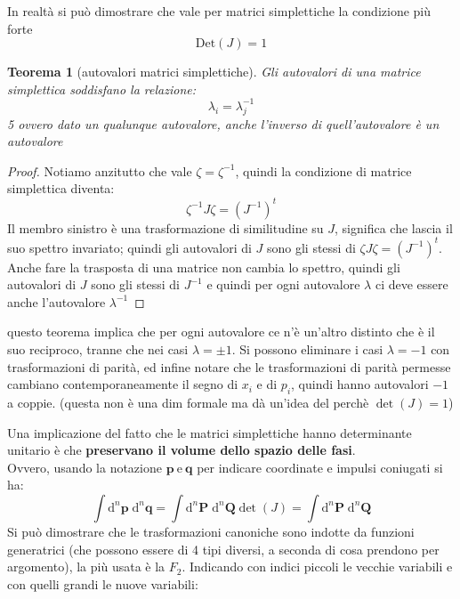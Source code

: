 \documentclass[a4paper,12pt]{article}
\theoremstyle{plain}
\renewcommand{\vec}[1]{{\boldsymbol{#1}}}
\newtheorem{thm}{Teorema}[section]
\theoremstyle{definition}
\renewcommand{\d}{\text{d}}
\newcommand{\econg}{~\text{e}~}
\newcommand{\mom}{\vec{p}}
\theoremstyle{remark}
\begin{document}
In realtà si può dimostrare che vale per matrici simplettiche la condizione più forte 
\[\text{Det}(J)=1\]

\begin{thm} [autovalori matrici simplettiche]
	\label{Sim}
	Gli autovalori di una matrice simplettica soddisfano la relazione:
	\[\lambda_i=\lambda_j^{-1}\]5
	ovvero dato un qualunque autovalore, anche l'inverso di quell'autovalore è un autovalore
\end{thm}

\begin{proof}
	Notiamo anzitutto che vale $\zeta=\zeta^{-1}$, quindi la condizione di matrice simplettica diventa:
	\[\zeta^{-1} J\zeta=\left(J^{-1}\right)^t		\]
	Il membro sinistro è una trasformazione di similitudine su $J$, significa che lascia il suo spettro invariato; quindi gli autovalori di $J$ sono gli stessi di $\zeta J\zeta=\left(J^{-1}\right)^t$.\\Anche fare la trasposta di una matrice non cambia lo spettro, quindi gli autovalori di $J$ sono gli stessi di $J^{-1}$ e quindi per ogni autovalore $\lambda$ ci deve essere anche l'autovalore $\lambda^{-1}$
	
	
	
	
	
	
\end{proof}
\begin{obs}
questo teorema implica che per ogni autovalore ce n'è un'altro distinto che è il suo reciproco, tranne che nei casi $\lambda=\pm 1$. Si possono eliminare i casi $\lambda=-1$ con trasformazioni di parità, ed infine notare che le trasformazioni di parità  permesse
 cambiano contemporaneamente il segno di $x_i$
e di $p_i$, quindi hanno autovalori $-1$ a coppie. (questa non è una dim formale ma dà un'idea del perchè $\det(J)=1$)

\end{obs}
Una implicazione del fatto che le matrici simplettiche hanno determinante unitario è che \textbf{preservano il volume dello spazio delle fasi}.\\
Ovvero, usando la notazione $\vec{p}\econg\vec{q}$ per indicare coordinate e impulsi coniugati si ha:
\[\int  \d^n\mom	\;	\d^n\vec{q}=\int  \d^n\vec{P}\;\d^n\vec{Q}\det(J)=\int  \d^n\vec{P}\;\d^n\vec{Q}	\]
Si può dimostrare che le trasformazioni canoniche sono indotte da funzioni generatrici (che possono essere di 4 tipi diversi, a seconda di cosa prendono per argomento), la più usata è la $F_2$. Indicando con indici piccoli le vecchie variabili e con quelli grandi le nuove variabili:
\end{document}
